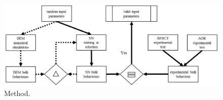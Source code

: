 \begin{figure}[!htb] 
\centering 
\includegraphics[width=.96\textwidth]{images/19methodology} 
\caption[Method]{Method.}
\label{fig:19methodology} 
\end{figure}